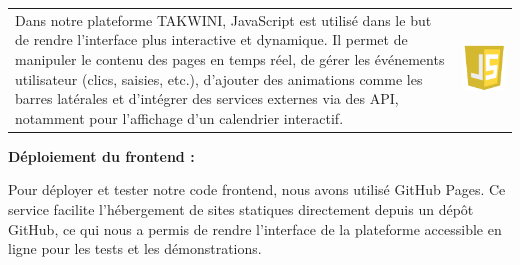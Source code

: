 \documentclass{article}
\begin{document}
\noindent
\begin{tabular}
{@{}m{}@{\hspace{1em}}m{}@{}}
Dans notre plateforme TAKWINI, JavaScript est utilisé dans le but  de rendre l’interface plus interactive et dynamique. Il permet de manipuler le contenu des pages en temps réel, de gérer les événements utilisateur (clics, saisies, etc.), d’ajouter des animations comme les barres latérales et d’intégrer des services externes via des API, notamment pour l’affichage d’un calendrier interactif.
&
\includegraphics[width=\linewidth]{js.png} %
\end{tabular}

\noindent \large \textbf{Déploiement du frontend :}

\vspace{0,3cm}

Pour déployer et tester notre code frontend, nous avons utilisé GitHub Pages. Ce service facilite l'hébergement de sites statiques directement depuis un dépôt GitHub, ce qui nous a permis de rendre l'interface de la plateforme accessible en ligne pour les tests et les démonstrations.
\end{document}
